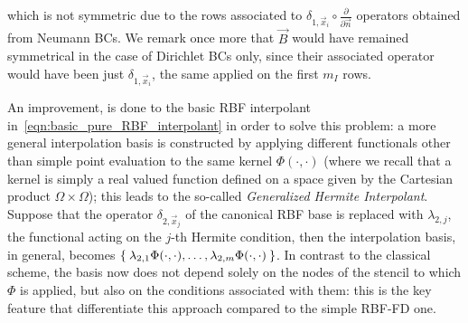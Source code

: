 which is not symmetric due to the rows associated to $\delta_{1,\vec{x}_{i}} \circ \frac{\partial}{\partial \vec{n}}$ operators obtained from Neumann BCs. We remark once more that $\vec{B}$ would have remained symmetrical in the case of Dirichlet BCs only, since their associated operator would have been just $\delta_{1,\vec{x}_{i}}$, the same applied on the first $m_I$ rows.

\smallskip
An improvement, is done to the basic RBF interpolant in~\eqref{eqn:basic_pure_RBF_interpolant} in order to solve this problem: a more general interpolation basis is constructed by applying different functionals other than simple point evaluation to the same kernel $\Phi(\cdot, \cdot)$ (where we recall that a kernel is simply a real valued function defined on a space given by the Cartesian product $\Omega \times \Omega$); this leads to the so-called \emph{Generalized Hermite Interpolant}. Suppose that the operator $\delta_{2, \vec{x}_j}$ of the canonical RBF base is replaced with $\lambda_{2,j}$, the functional acting on the $j$-th Hermite condition, then the interpolation basis, in general, becomes $\Set{\lambda_{2,1} \Phi(\cdot, \cdot), \dots, \lambda_{2,m} \Phi(\cdot, \cdot)}$. In contrast to the classical scheme, the basis now does not depend solely on the nodes of the stencil to which $\Phi$ is applied, but also on the conditions associated with them: this is the key feature that differentiate this approach compared to the simple RBF-FD one.

